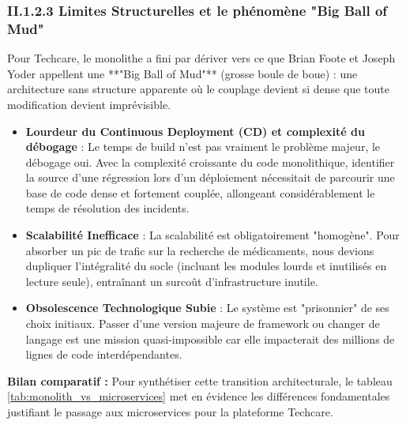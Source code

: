 \subsubsection{II.1.2.3 Limites Structurelles et le phénomène "Big Ball of Mud"}
Pour Techcare, le monolithe a fini par dériver vers ce que Brian Foote et Joseph Yoder appellent une **"Big Ball of Mud"** (grosse boule de boue) : une architecture sans structure apparente où le couplage devient si dense que toute modification devient imprévisible.
\begin{itemize}
    \item \textbf{Lourdeur du Continuous Deployment (CD) et complexité du débogage} : Le temps de build n'est pas vraiment le problème majeur, le débogage oui. Avec la complexité croissante du code monolithique, identifier la source d'une régression lors d'un déploiement nécessitait de parcourir une base de code dense et fortement couplée, allongeant considérablement le temps de résolution des incidents.
    \item \textbf{Scalabilité Inefficace} : La scalabilité est obligatoirement "homogène". Pour absorber un pic de trafic sur la recherche de médicaments, nous devions dupliquer l'intégralité du socle (incluant les modules lourds et inutilisés en lecture seule), entraînant un surcoût d'infrastructure inutile.
    \item \textbf{Obsolescence Technologique Subie} : Le système est "prisonnier" de ses choix initiaux. Passer d'une version majeure de framework ou changer de langage est une mission quasi-impossible car elle impacterait des millions de lignes de code interdépendantes.
\end{itemize}

\textbf{Bilan comparatif :}
Pour synthétiser cette transition architecturale, le tableau \ref{tab:monolith_vs_microservices} met en évidence les différences fondamentales justifiant le passage aux microservices pour la plateforme Techcare.

